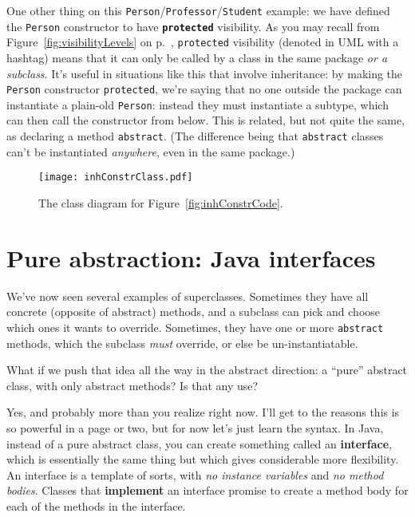 One other thing on this \texttt{Person}/\texttt{Professor}/\texttt{Student}
example: we have defined the \texttt{Person} constructor to have
\textbf{\texttt{protected}} visibility. As you may recall from
Figure~\ref{fig:visibilityLevels} on p.~\pageref{fig:visibilityLevels},
\texttt{protected} visibility (denoted in UML with a hashtag) means that it
can only be called by a class in the same package \textit{or a subclass}. It's
useful in situations like this that involve inheritance: by making the
\texttt{Person} constructor \texttt{protected}, we're saying that no one
outside the package can instantiate a plain-old \texttt{Person}: instead they
must instantiate a subtype, which can then call the constructor from below.
This is related, but not quite the same, as declaring a method
\texttt{abstract}. (The difference being that \texttt{abstract} classes can't
be instantiated \textit{anywhere}, even in the same package.)

\begin{figure}
\centering
\texttt{[image: inhConstrClass.pdf]}
\caption{The class diagram for Figure~\ref{fig:inhConstrCode}.}
\label{fig:inhConstrClass}
\end{figure}


\section{Pure abstraction: Java interfaces}
\label{sec:interfaces}

We've now seen several examples of superclasses. Sometimes they have all
concrete (opposite of abstract) methods, and a subclass can pick and choose
which ones it wants to override. Sometimes, they have one or more
\texttt{abstract} methods, which the subclass \textit{must} override, or else
be un-instantiatable.

What if we push that idea all the way in the abstract direction: a ``pure''
abstract class, with only abstract methods? Is that any use?

Yes, and probably more than you realize right now. I'll get to the reasons
this is so powerful in a page or two, but for now let's just learn the syntax.
In Java, instead of a pure abstract class, you can create something called an
\textbf{interface}, which is essentially the same thing but which gives
considerable more flexibility. An interface is a template of sorts, with
\textit{no instance variables} and \textit{no method bodies}. Classes that
\textbf{implement} an interface promise to create a method body for each of
the methods in the interface.

